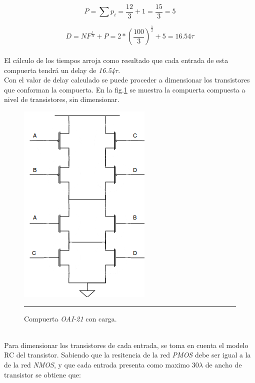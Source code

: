 \documentclass[12pt,a4paper]{article} %
\begin{document}
{\begin{equation}\label{eqn:delay_parasitico2}
P = \sum p_{i} = \frac{12}{3} + 1 = \frac{15}{3} = 5
\end{equation}

\begin{equation}\label{eqn:delay2}
D = NF^{\frac{1}{N}} + P = 2*(\frac{100}{3})^{\frac{1}{2}} + 5 = 16.54\tau
\end{equation}\\

El cálculo de los tiempos arroja como resultado que cada entrada de esta compuerta tendrá un delay de \textit{16.54$\tau$}.\\

Con el valor de delay calculado se puede proceder a dimensionar los transistores que conforman la compuerta. En la fig.\ref{fig:Comp_Transistores} se muestra la compuerta compuesta a nivel de transistores, sin dimensionar.\\

\begin{figure}[htbp]
  \centering
    \includegraphics[scale=0.5]{./Comp_Transistores.png}
    \rule{35em}{0.5pt}
  \caption[IdealvsSim]{Compuerta \textit{OAI-21} con carga.}
  \label{fig:Comp_Transistores}
\end{figure}\\

Para dimensionar los transistores de cada entrada, se toma en cuenta el modelo RC del transistor. Sabiendo que la resitencia de la red \textit{PMOS} debe ser igual a la de la red \textit{NMOS}, y que cada entrada presenta como maximo 30$\lambda$ de ancho de transistor se obtiene que:\\

}
\end{document}
